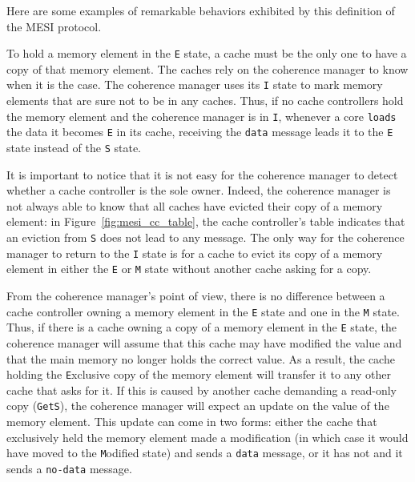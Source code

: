 Here are some examples of remarkable behaviors exhibited by this definition of
the MESI protocol.

\begin{example}
\label{ex:reaching_e}
To hold a memory element in the \texttt{E} state, a cache must be the only one
to have a copy of that memory element. The caches rely on the coherence manager
to know when it is the case. The coherence manager uses its \texttt{I} state to
mark memory elements that are sure not to be in any caches.  Thus, if no cache
controllers hold the memory element and the coherence manager is in \texttt{I},
whenever a core \texttt{loads} the data it becomes \texttt{E} in its cache,
receiving the \texttt{data} message leads it to the \texttt{E} state instead of
the \texttt{S} state.

It is important to notice that it is not easy for the coherence manager to detect whether a cache controller is the sole owner.
Indeed, the
coherence manager is not always able to know that all caches have evicted their
copy of a memory element: in Figure~\ref{fig:mesi_cc_table}, the cache
controller's table indicates that an eviction from \texttt{S} does not lead to
any message.
The only way for the coherence
manager to return to the \texttt{I} state is for a cache to evict its copy
of a memory element in either the \texttt{E} or \texttt{M} state without another
cache asking for a copy.
\end{example}

\begin{example}
\label{ex:sharing_from_e}
From the coherence manager's point of view, there is no difference between a
cache controller owning a memory element in the \texttt{E} state and one in the
\texttt{M} state. Thus, if there is a cache owning a copy of a memory element in
the \texttt{E} state, the coherence manager will assume that this cache may have
modified the value and that the main memory no longer holds the correct value.
As a result, the cache holding the \texttt{E}xclusive copy of the memory element
will transfer it to any other cache that asks for it. If this is caused by
another cache demanding a read-only copy (\texttt{GetS}), the coherence manager
will expect an update on the value of the memory element. This update can come
in two forms: either the cache that exclusively held the memory element made a
modification (in which case it would have moved to the \texttt{M}odified state)
and sends a \texttt{data} message, or it has not and it sends a \texttt{no-data} message.
\end{example}
